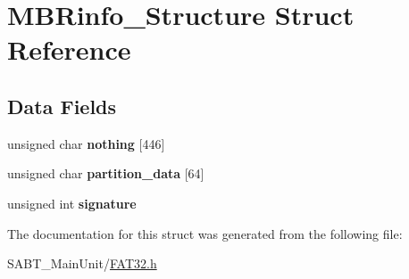 \hypertarget{struct_m_b_rinfo___structure}{\section{M\-B\-Rinfo\-\_\-\-Structure Struct Reference}
\label{struct_m_b_rinfo___structure}
}
\subsection*{Data Fields}
\begin{DoxyCompactItemize}
\item 
\hypertarget{struct_m_b_rinfo___structure_adb1269685994bb6606c35c0bc62a90a9}{unsigned char {\bfseries nothing} \mbox{[}446\mbox{]}}\label{struct_m_b_rinfo___structure_adb1269685994bb6606c35c0bc62a90a9}

\item 
\hypertarget{struct_m_b_rinfo___structure_a36ed196cb360823f6e8eb8b85e91726c}{unsigned char {\bfseries partition\-\_\-data} \mbox{[}64\mbox{]}}\label{struct_m_b_rinfo___structure_a36ed196cb360823f6e8eb8b85e91726c}

\item 
\hypertarget{struct_m_b_rinfo___structure_a32bcd003887ba3429d144be1c0ba1fad}{unsigned int {\bfseries signature}}\label{struct_m_b_rinfo___structure_a32bcd003887ba3429d144be1c0ba1fad}

\end{DoxyCompactItemize}


The documentation for this struct was generated from the following file\-:\begin{DoxyCompactItemize}
\item 
S\-A\-B\-T\-\_\-\-Main\-Unit/\hyperlink{_f_a_t32_8h}{F\-A\-T32.\-h}\end{DoxyCompactItemize}
